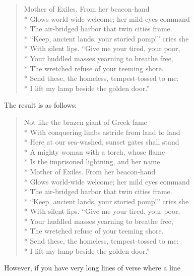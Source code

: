 \begin{Example}
\begin{lstcode}
\begin{verse}
    Mother of Exiles. From her beacon-hand\\*
    Glows world-wide welcome; her mild eyes command\\*
    The air-bridged harbor that twin cities frame.\\*
    ``Keep, ancient lands, your storied pomp!'' cries she\\*
    With silent lips. ``Give me your tired, your poor,\\*
    Your huddled masses yearning to breathe free,\\*
    The wretched refuse of your teeming shore.\\*
    Send these, the homeless, tempest-tossed to me:\\*
    I lift my lamp beside the golden door.''
  \end{verse}
\end{lstcode}
        The result is as follows:
        \begin{ShowOutput}
          \begin{verse}
            Not like the brazen giant of Greek fame\\*
            With conquering limbs astride from land to land\\*
            Here at our sea-washed, sunset gates shall stand\\*
            A mighty woman with a torch, whose flame\\*
            Is the imprisoned lightning, and her name\\*
            Mother of Exiles. From her beacon-hand\\*
            Glows world-wide welcome; her mild eyes command\\*
            The air-bridged harbor that twin cities frame.\\*
            ``Keep, ancient lands, your storied pomp!'' cries she\\*
            With silent lips. ``Give me your tired, your poor,\\*
            Your huddled masses yearning to breathe free,\\*
            The wretched refuse of your teeming shore.\\*
            Send these, the homeless, tempest-tossed to me:\\*
            I lift my lamp beside the golden door.''
          \end{verse}
        \end{ShowOutput}
      \fi
      However, if you have very long lines of verse where a line

\end{Example}
